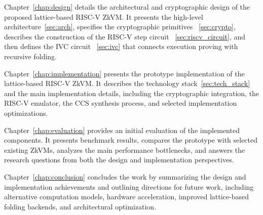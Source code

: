 Chapter~\ref{chap:design} details the architectural and cryptographic design
of the proposed lattice-based RISC-V ZkVM. It presents the high-level
architecture~\ref{sec:arch}, specifies the cryptographic primitives
~\ref{sec:crypto}, describes the construction of the RISC-V step circuit
~\ref{sec:riscv_circuit}, and then defines the IVC circuit
~\ref{sec:ivc} that connects execution proving with recursive folding.

Chapter~\ref{chap:implementation} presents the prototype implementation of the
lattice-based RISC-V ZkVM. It describes the technology stack~\ref{sec:tech_stack}
and the main implementation details, including the cryptographic integration,
the RISC-V emulator, the CCS synthesis process, and selected implementation
optimizations.

Chapter~\ref{chap:evaluation} provides an initial evaluation of the implemented
components. It presents benchmark results, compares the prototype with selected
existing ZkVMs, analyzes the main performance bottlenecks, and answers the
research questions from both the design and implementation perspectives.

Chapter~\ref{chap:conclusion} concludes the work by summarizing the design
and implementation achievements and outlining directions for future work,
including alternative computation models, hardware acceleration, improved
lattice-based folding backends, and architectural optimization.
